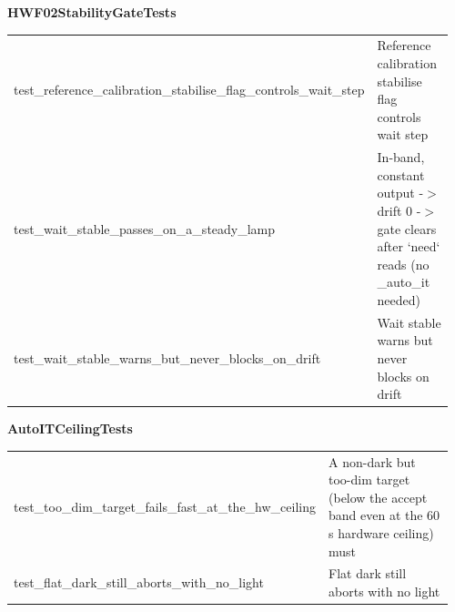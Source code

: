 \par\smallskip \textbf{HWF02StabilityGateTests}\par\nopagebreak\smallskip
\begin{longtable}{@{}>{\ttfamily\scriptsize\raggedright\arraybackslash}p{0.40\linewidth} >{\footnotesize\raggedright\arraybackslash}p{0.555\linewidth}@{}}
test\_\allowbreak{}reference\_\allowbreak{}calibration\_\allowbreak{}stabilise\_\allowbreak{}flag\_\allowbreak{}controls\_\allowbreak{}wait\_\allowbreak{}step & Reference calibration stabilise flag controls wait step \\
test\_\allowbreak{}wait\_\allowbreak{}stable\_\allowbreak{}passes\_\allowbreak{}on\_\allowbreak{}a\_\allowbreak{}steady\_\allowbreak{}lamp & In-band, constant output -$>$ drift 0 -$>$ gate clears after `need` reads (no \_auto\_it needed) \\
test\_\allowbreak{}wait\_\allowbreak{}stable\_\allowbreak{}warns\_\allowbreak{}but\_\allowbreak{}never\_\allowbreak{}blocks\_\allowbreak{}on\_\allowbreak{}drift & Wait stable warns but never blocks on drift \\
\end{longtable}
\par\smallskip \textbf{AutoITCeilingTests}\par\nopagebreak\smallskip
\begin{longtable}{@{}>{\ttfamily\scriptsize\raggedright\arraybackslash}p{0.40\linewidth} >{\footnotesize\raggedright\arraybackslash}p{0.555\linewidth}@{}}
test\_\allowbreak{}too\_\allowbreak{}dim\_\allowbreak{}target\_\allowbreak{}fails\_\allowbreak{}fast\_\allowbreak{}at\_\allowbreak{}the\_\allowbreak{}hw\_\allowbreak{}ceiling & A non-dark but too-dim target (below the accept band even at the 60 s hardware ceiling) must \\
test\_\allowbreak{}flat\_\allowbreak{}dark\_\allowbreak{}still\_\allowbreak{}aborts\_\allowbreak{}with\_\allowbreak{}no\_\allowbreak{}light & Flat dark still aborts with no light \\
\end{longtable}
